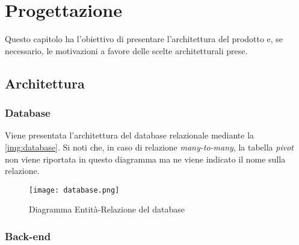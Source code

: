 
\chapter{Progettazione}
\label{cap:progettazione}
Questo capitolo ha l'obiettivo di presentare l'architettura del prodotto e, se necessario, le motivazioni a favore delle scelte architetturali prese.

\section{Architettura}
    \subsection{Database}
    Viene presentata l'architettura del database relazionale mediante la \autoref{img:database}. Si noti che, in caso di relazione \textit{many-to-many}, la tabella \textit{pivot} non viene riportata in questo diagramma ma ne viene indicato il nome sulla relazione.

    \begin{figure}[p]
        \centering
        \hspace*{-2cm}
        \texttt{[image: database.png]}
        \caption{Diagramma Entità-Relazione del database}
        \label{img:database}
    \end{figure}

    \subsection{Back-end}
